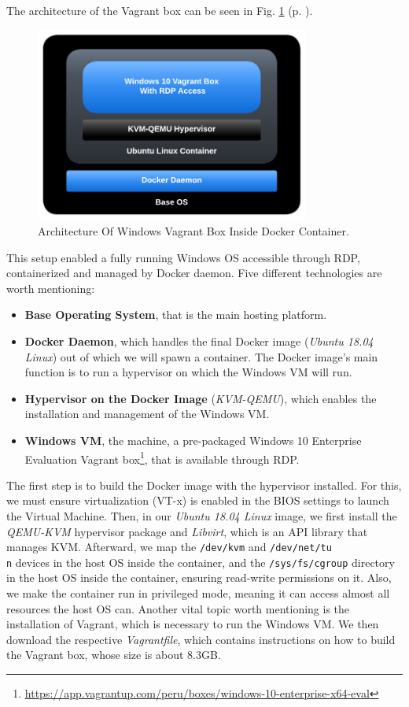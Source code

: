 The architecture of the Vagrant box can be seen in Fig. \ref{fig:windows_vagrant_box_architecture} (p. \pageref{fig:windows_vagrant_box_architecture}).

\begin{figure}[H]
    \includegraphics[width=9cm]{figures/vagrant_box_container_diagram.pdf}
    \caption{Architecture Of Windows Vagrant Box Inside Docker Container.}
    \label{fig:windows_vagrant_box_architecture}
\end{figure}

This setup enabled a fully running Windows OS accessible through RDP, containerized and managed by Docker daemon. Five different technologies are worth mentioning:

\begin{itemize}
    \item \textbf{Base Operating System}, that is the main hosting platform.
    \item \textbf{Docker Daemon}, which handles the final Docker image (\textit{Ubuntu 18.04 Linux}) out of which we will spawn a container. The Docker image's main function is to run a hypervisor on which the Windows VM will run.
    \item \textbf{Hypervisor on the Docker Image} (\textit{KVM-QEMU}), which enables the installation and management of the Windows VM.
    \item \textbf{Windows VM}, the machine, a pre-packaged Windows 10 Enterprise Evaluation Vagrant box\footnote{\url{https://app.vagrantup.com/peru/boxes/windows-10-enterprise-x64-eval}}, that is available through RDP.
\end{itemize}

The first step is to build the Docker image with the hypervisor installed. For this, we must ensure virtualization (VT-x) is enabled in the BIOS settings to launch the Virtual Machine. Then, in our \textit{Ubuntu 18.04 Linux} image, we first install the \textit{QEMU-KVM} hypervisor package and \textit{Libvirt}, which is an API library that manages KVM. Afterward, we map the \texttt{/dev/kvm} and \texttt{/dev/net/tu\\n} devices in the host OS inside the container, and the \texttt{/sys/fs/cgroup} directory in the host OS inside the container, ensuring read-write permissions on it. Also, we make the container run in privileged mode, meaning it can access almost all resources the host OS can. Another vital topic worth mentioning is the installation of Vagrant, which is necessary to run the Windows VM. We then download the respective \textit{Vagrantfile}, which contains instructions on how to build the Vagrant box, whose size is about 8.3GB.

